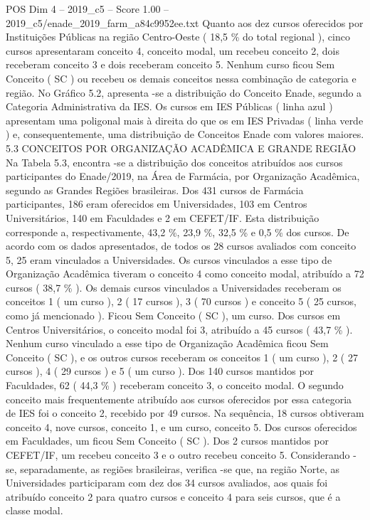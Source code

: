 \begin{textsample}{POS Dim 4 – 2019\_c5 – Score 1.00 – 2019\_c5/enade\_2019\_farm\_a84c9952ee.txt}
Quanto aos dez cursos oferecidos por Instituições Públicas na região Centro-Oeste ( 18,5 \% do total regional ), cinco cursos apresentaram conceito 4, conceito modal, um recebeu conceito 2, dois receberam conceito 3 e dois receberam conceito 5.
Nenhum curso ficou Sem Conceito ( SC ) ou recebeu os demais conceitos nessa combinação de categoria e região.
No Gráfico 5.2, apresenta -se a distribuição do Conceito Enade, segundo a Categoria Administrativa da IES.
Os cursos em IES Públicas ( linha azul ) apresentam uma poligonal mais à direita do que os em IES Privadas ( linha verde ) e, consequentemente, uma distribuição de Conceitos Enade com valores maiores. 5.3 CONCEITOS POR ORGANIZAÇÃO ACADÊMICA E GRANDE REGIÃO Na Tabela 5.3, encontra -se a distribuição dos conceitos atribuídos aos cursos participantes do Enade/2019, na Área de Farmácia, por Organização Acadêmica, segundo as Grandes Regiões brasileiras.
Dos 431 cursos de Farmácia participantes, 186 eram oferecidos em Universidades, 103 em Centros Universitários, 140 em Faculdades e 2 em CEFET/IF.
Esta distribuição corresponde a, respectivamente, 43,2 \%, 23,9 \%, 32,5 \% e 0,5 \% dos cursos.
De acordo com os dados apresentados, de todos os 28 cursos avaliados com conceito 5, 25 eram vinculados a Universidades.
Os cursos vinculados a esse tipo de Organização Acadêmica tiveram o conceito 4 como conceito modal, atribuído a 72 cursos ( 38,7 \% ).
Os demais cursos vinculados a Universidades receberam os conceitos 1 ( um curso ), 2 ( 17 cursos ), 3 ( 70 cursos ) e conceito 5 ( 25 cursos, como já mencionado ).
Ficou Sem Conceito ( SC ), um curso.
Dos cursos em Centros Universitários, o conceito modal foi 3, atribuído a 45 cursos ( 43,7 \% ).
Nenhum curso vinculado a esse tipo de Organização Acadêmica ficou Sem Conceito ( SC ), e os outros cursos receberam os conceitos 1 ( um curso ), 2 ( 27 cursos ), 4 ( 29 cursos ) e 5 ( um curso ).
Dos 140 cursos mantidos por Faculdades, 62 ( 44,3 \% ) receberam conceito 3, o conceito modal.
O segundo conceito mais frequentemente atribuído aos cursos oferecidos por essa categoria de IES foi o conceito 2, recebido por 49 cursos.
Na sequência, 18 cursos obtiveram conceito 4, nove cursos, conceito 1, e um curso, conceito 5.
Dos cursos oferecidos em Faculdades, um ficou Sem Conceito ( SC ).
Dos 2 cursos mantidos por CEFET/IF, um recebeu conceito 3 e o outro recebeu conceito 5.
Considerando -se, separadamente, as regiões brasileiras, verifica -se que, na região Norte, as Universidades participaram com dez dos 34 cursos avaliados, aos quais foi atribuído conceito 2 para quatro cursos e conceito 4 para seis cursos, que é a classe modal.

\end{textsample}
